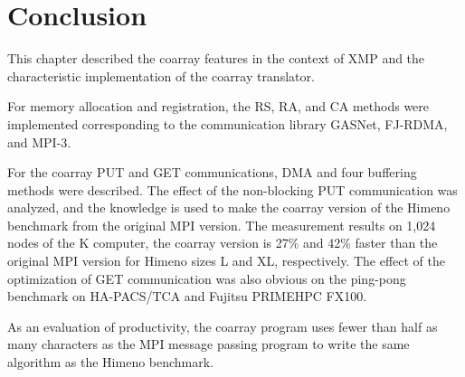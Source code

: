 ﻿\section{Conclusion}\label{sec:concl}

This chapter described the coarray features in the context of XMP and 
the characteristic implementation of the coarray translator.

For memory allocation and registration, the RS, RA, and CA methods were
implemented corresponding to the communication library GASNet, FJ-RDMA,
and MPI-3.

For the coarray PUT and GET communications, DMA and four buffering methods
were described. The effect of the non-blocking PUT communication was
analyzed, and the knowledge is used to make the coarray version of the Himeno benchmark
from the original MPI version.
The measurement results on 1,024 nodes of the K computer, the coarray version 
is 27\% and 42\% faster than the original MPI version for Himeno sizes
L and XL, respectively.
The effect of the optimization of GET communication was also obvious on 
the ping-pong benchmark on HA-PACS/TCA and Fujitsu PRIMEHPC FX100.

As an evaluation of productivity, the coarray program uses fewer than half as
many characters as the MPI message passing program to write the same algorithm
as the Himeno benchmark.




